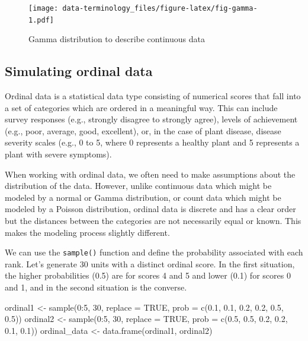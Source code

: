 \documentclass[
  letterpaper,
]{book}
\newenvironment{Shaded}{\begin{snugshade}}{\end{snugshade}}
\newcommand{\AttributeTok}[1]{\textcolor[rgb]{0.40,0.45,0.13}{#1}}
\newcommand{\ConstantTok}[1]{\textcolor[rgb]{0.56,0.35,0.01}{#1}}
\newcommand{\DecValTok}[1]{\textcolor[rgb]{0.68,0.00,0.00}{#1}}
\newcommand{\FloatTok}[1]{\textcolor[rgb]{0.68,0.00,0.00}{#1}}
\newcommand{\FunctionTok}[1]{\textcolor[rgb]{0.28,0.35,0.67}{#1}}
\newcommand{\NormalTok}[1]{\textcolor[rgb]{0.00,0.23,0.31}{#1}}
\newcommand{\OtherTok}[1]{\textcolor[rgb]{0.00,0.23,0.31}{#1}}
\newcommand{\SpecialCharTok}[1]{\textcolor[rgb]{0.37,0.37,0.37}{#1}}
\begin{document}
\begin{figure}

\texttt{[image: data-terminology\_files/figure-latex/fig-gamma-1.pdf]} \hfill{}

\caption{\label{fig-gamma}Gamma distribution to describe continuous
data}

\end{figure}

\hypertarget{simulating-ordinal-data}{%
\subsection{Simulating ordinal data}\label{simulating-ordinal-data}}

Ordinal data is a statistical data type consisting of numerical scores
that fall into a set of categories which are ordered in a meaningful
way. This can include survey responses (e.g., strongly disagree to
strongly agree), levels of achievement (e.g., poor, average, good,
excellent), or, in the case of plant disease, disease severity scales
(e.g., 0 to 5, where 0 represents a healthy plant and 5 represents a
plant with severe symptoms).

When working with ordinal data, we often need to make assumptions about
the distribution of the data. However, unlike continuous data which
might be modeled by a normal or Gamma distribution, or count data which
might be modeled by a Poisson distribution, ordinal data is discrete and
has a clear order but the distances between the categories are not
necessarily equal or known. This makes the modeling process slightly
different.

We can use the \texttt{sample()} function and define the probability
associated with each rank. Let's generate 30 units with a distinct
ordinal score. In the first situation, the higher probabilities (0.5)
are for scores 4 and 5 and lower (0.1) for scores 0 and 1, and in the
second situation is the converse.

\begin{Shaded}
\begin{Highlighting}[]
\NormalTok{ordinal1 }\OtherTok{\textless{}{-}} \FunctionTok{sample}\NormalTok{(}\DecValTok{0}\SpecialCharTok{:}\DecValTok{5}\NormalTok{, }\DecValTok{30}\NormalTok{, }\AttributeTok{replace =} \ConstantTok{TRUE}\NormalTok{, }\AttributeTok{prob =} \FunctionTok{c}\NormalTok{(}\FloatTok{0.1}\NormalTok{, }\FloatTok{0.1}\NormalTok{, }\FloatTok{0.2}\NormalTok{, }\FloatTok{0.2}\NormalTok{, }\FloatTok{0.5}\NormalTok{, }\FloatTok{0.5}\NormalTok{))}
\NormalTok{ordinal2 }\OtherTok{\textless{}{-}} \FunctionTok{sample}\NormalTok{(}\DecValTok{0}\SpecialCharTok{:}\DecValTok{5}\NormalTok{, }\DecValTok{30}\NormalTok{, }\AttributeTok{replace =} \ConstantTok{TRUE}\NormalTok{, }\AttributeTok{prob =} \FunctionTok{c}\NormalTok{(}\FloatTok{0.5}\NormalTok{, }\FloatTok{0.5}\NormalTok{, }\FloatTok{0.2}\NormalTok{, }\FloatTok{0.2}\NormalTok{, }\FloatTok{0.1}\NormalTok{, }\FloatTok{0.1}\NormalTok{))}
\NormalTok{ordinal\_data }\OtherTok{\textless{}{-}} \FunctionTok{data.frame}\NormalTok{(ordinal1, ordinal2)}
\end{Highlighting}
\end{Shaded}
\end{document}
